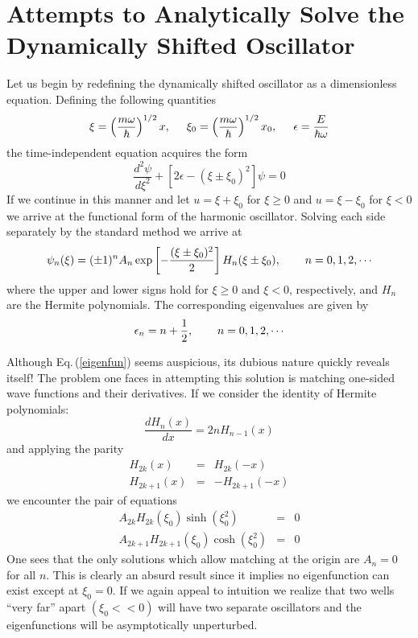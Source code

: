\documentclass[12pt]{article}
\begin{document}
\section{Attempts to Analytically Solve the Dynamically Shifted Oscillator}
Let us begin by redefining the dynamically shifted oscillator as a dimensionless equation. Defining the following quantities 
\begin{equation}
\xi=\left(\frac{m\omega}{\hbar}\right)^{1/2}x, \hspace{0.5cm} \xi_0=\left(\frac{m\omega}{\hbar}\right)^{1/2}x_0, \hspace{0.5cm} \epsilon=\frac{E}{\hbar\omega}
\end{equation}
the time-independent equation acquires the form
\begin{equation}
\frac{d^2\psi}{d\xi^2}+\left[2\epsilon-(\xi\pm\xi_0)^2\right]\psi=0		\label{SE}
\end{equation}
If we continue in this manner and let $u= \xi + \xi_0$ for $\xi \geq 0$ and $u=\xi-\xi_0$ for $\xi<0$ we arrive at the functional form of the harmonic oscillator. Solving each side separately by the standard method we arrive at 
\begin{equation}
\psi_n(\xi)=(\pm 1)^n A_n\exp\left[-\frac{(\xi\pm \xi_0)^2}{2}\right]H_n(\xi\pm \xi_0),  \hspace{0.75cm}  n=0,1,2,\cdots	\label{eigenfun}
\end{equation}
where the upper and lower signs hold for $\xi \geq 0$ and $\xi<0$, respectively, and $H_n$ are the Hermite polynomials. The corresponding eigenvalues are given by
\begin{equation}
\epsilon_n=n+\frac{1}{2},	\hspace{0.75cm}  n=0,1,2,\cdots		\label{eigenval}
\end{equation}

\par Although Eq.\,(\ref{eigenfun}) seems auspicious, its dubious nature quickly reveals itself! The problem one faces in attempting this solution is matching one-sided wave functions and their derivatives. If we consider the identity of Hermite polynomials: 
\begin{equation}
\frac{dH_n(x)}{dx}=2nH_{n-1}(x)
\end{equation}
and applying the parity
\begin{eqnarray}
H_{2k}(x) &=& H_{2k}(-x)\\
H_{2k+1}(x)&=& -H_{2k+1}(-x)
\end{eqnarray}
we encounter the pair of equations
\begin{eqnarray}
A_{2k} H_{2k}(\xi_0) \sinh(\xi_0^2) &=& 0 \\
A_{2k+1}H_{2k+1}(\xi_0) \cosh(\xi_0^2)&=&0
\end{eqnarray}
One sees that the only solutions which allow matching at the origin are $A_n=0$ for all $n.$    This is clearly an absurd result since it 
implies no eigenfunction can exist except at $\xi_0=0$. If we again appeal to intuition we realize that two wells ``very far'' apart 
$(\xi_0 << 0)$ will have two separate oscillators and the eigenfunctions will be asymptotically unperturbed.
\end{document}
